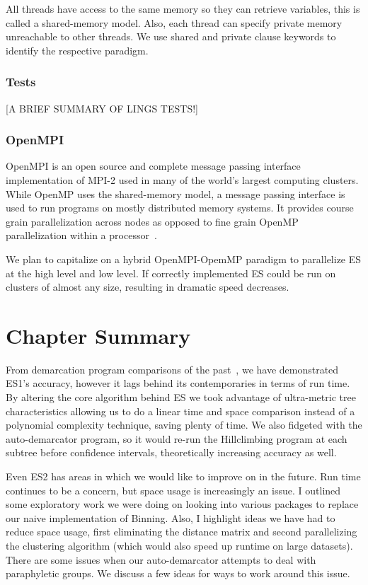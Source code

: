 All threads have access to the same memory so they can retrieve variables, this is called a shared-memory model.
Also, each thread can specify private memory unreachable to other threads.
We use shared and private clause keywords to identify the respective paradigm.

\subsubsection*{Tests}
[A BRIEF SUMMARY OF LINGS TESTS!]

\subsubsection*{OpenMPI}
OpenMPI is an open source and complete message passing interface implementation of MPI-2 used in many of the world's largest computing clusters.
While OpenMP uses the shared-memory model, a message passing interface is used to run programs on mostly distributed memory systems.
It provides course grain parallelization across nodes as opposed to fine grain OpenMP parallelization within a processor~\cite{gabriel04:_open_mpi}.

We plan to capitalize on a hybrid OpenMPI-OpemMP paradigm to parallelize ES at the high level and low level.
If correctly implemented ES could be run on clusters of almost any size, resulting in dramatic speed decreases.


\section{Chapter Summary}
From demarcation program comparisons of the past~\cite{carlo}, we have demonstrated ES1's accuracy, however it lags behind its contemporaries in terms of run time.
By altering the core algorithm behind ES we took advantage of ultra-metric tree characteristics allowing us to do a linear time and space comparison instead of a polynomial complexity technique, saving plenty of time.
We also fidgeted with the auto-demarcator program, so it would re-run the Hillclimbing program at each subtree before confidence intervals, theoretically increasing accuracy as well.

Even ES2 has areas in which we would like to improve on in the future.
Run time continues to be a concern, but space usage is increasingly an issue.
I outlined some exploratory work we were doing on looking into various packages to replace our naive implementation of Binning.
Also, I highlight ideas we have had to reduce space usage, first eliminating the distance matrix and second parallelizing the clustering algorithm (which would also speed up runtime on large datasets).
There are some issues when our auto-demarcator attempts to deal with paraphyletic groups.
We discuss a few ideas for ways to work around this issue.

